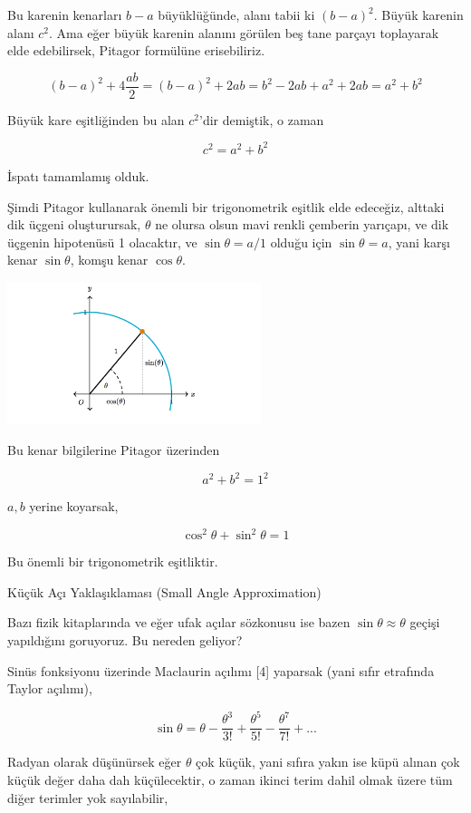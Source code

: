 \documentclass[12pt,fleqn]{article}\usepackage{../../common}
\begin{document}
Bu karenin kenarları $b-a$ büyüklüğünde, alanı tabii ki $(b-a)^2$. Büyük karenin
alanı $c^2$. Ama eğer büyük karenin alanını görülen beş tane parçayı toplayarak
elde edebilirsek, Pitagor formülüne erisebiliriz.

$$
(b-a)^2 + 4 \frac{ab}{2} = (b-a)^2 + 2 ab = b^2 -2ab + a^2 + 2ab = a^2 + b^2
$$

Büyük kare eşitliğinden bu alan $c^2$'dir demiştik, o zaman

$$
c^2 = a^2 + b^2
$$

İspatı tamamlamış olduk.

Şimdi Pitagor kullanarak önemli bir trigonometrik eşitlik elde edeceğiz, alttaki
dik üçgeni oluşturursak, $\theta$ ne olursa olsun mavi renkli çemberin yarıçapı,
ve dik üçgenin hipotenüsü 1 olacaktır, ve $\sin\theta = a / 1$ olduğu için
$\sin\theta = a$, yani karşı kenar $\sin\theta$, komşu kenar $\cos\theta$.

\includegraphics[width=20em]{PythagorSinCos.png}

Bu kenar bilgilerine Pitagor üzerinden

$$
a^2 + b^2 = 1^2 
$$

$a,b$ yerine koyarsak,

$$
\cos^2\theta + \sin^2\theta = 1
$$

Bu önemli bir trigonometrik eşitliktir.

Küçük Açı Yaklaşıklaması (Small Angle Approximation)

Bazı fizik kitaplarında ve eğer ufak açılar sözkonusu ise bazen $\sin\theta
\approx \theta$ geçişi yapıldığını goruyoruz. Bu nereden geliyor?

Sinüs fonksiyonu üzerinde Maclaurin açılımı [4] yaparsak (yani sıfır etrafında
Taylor açılımı),

$$
\sin\theta =
\theta -
\frac{\theta^3}{3!} +
\frac{\theta^5}{5!} -
\frac{\theta^7}{7!} + ...
$$

Radyan olarak düşünürsek eğer $\theta$ çok küçük, yani sıfıra yakın ise küpü
alınan çok küçük değer daha dah küçülecektir, o zaman ikinci terim dahil olmak
üzere tüm diğer terimler yok sayılabilir,
\end{document}
